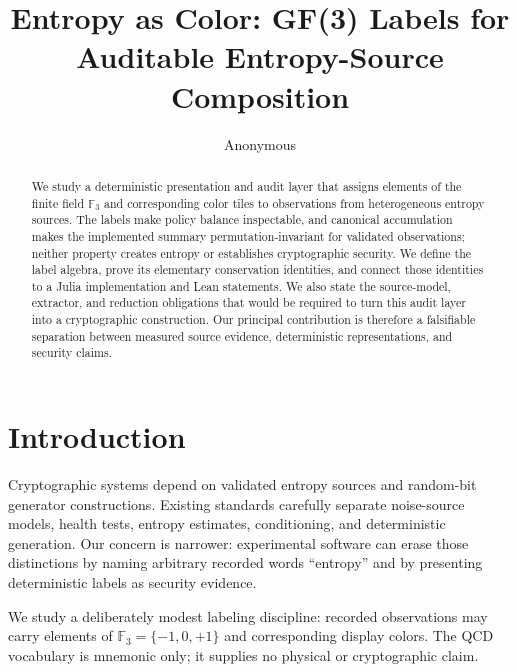 \documentclass[preprint,nohyperxmp]{iacrtrans}
\title{Entropy as Color: GF(3) Labels for Auditable Entropy-Source Composition}
\author{
  Anonymous\inst{1}
}
\institute{
  Anonymous Institution
}
\begin{document}
\maketitle


\begin{abstract}
We study a deterministic presentation and audit layer that assigns elements of the finite field $\mathbb{F}_3$ and corresponding color tiles to observations from heterogeneous entropy sources. The labels make policy balance inspectable, and canonical accumulation makes the implemented summary permutation-invariant for validated observations; neither property creates entropy or establishes cryptographic security. We define the label algebra, prove its elementary conservation identities, and connect those identities to a Julia implementation and Lean statements. We also state the source-model, extractor, and reduction obligations that would be required to turn this audit layer into a cryptographic construction. Our principal contribution is therefore a falsifiable separation between measured source evidence, deterministic representations, and security claims.
\end{abstract}

\section{Introduction}
\label{sec:intro}

Cryptographic systems depend on validated entropy sources and random-bit
generator constructions. Existing standards carefully separate noise-source
models, health tests, entropy estimates, conditioning, and deterministic
generation. Our concern is narrower: experimental software can erase those
distinctions by naming arbitrary recorded words ``entropy'' and by presenting
deterministic labels as security evidence.

We study a deliberately modest labeling discipline: recorded observations may
carry elements of $\mathbb F_3=\{-1,0,+1\}$ and corresponding display colors.
The QCD vocabulary is mnemonic only; it supplies no physical or cryptographic
claim.
\end{document}
